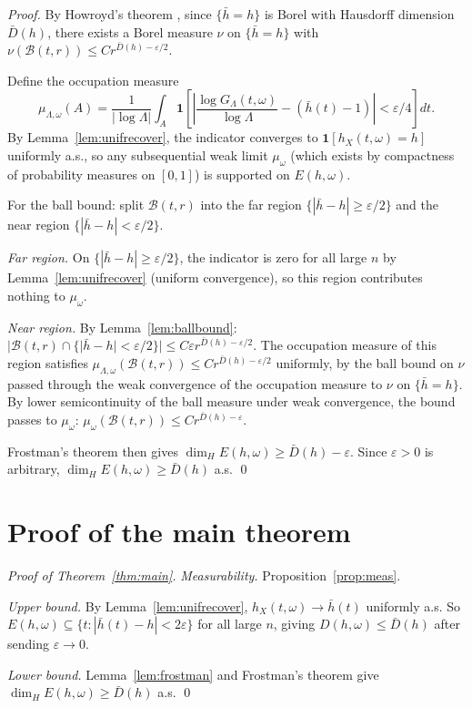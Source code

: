 \documentclass[10pt,a4paper]{amsart}
\newcommand{\GL}{G_\Lambda}
\newcommand{\hb}{\bar{h}}
\begin{document}
\begin{proof}
By Howroyd's theorem \cite{howroyd1995}, since $\{\hb=h\}$ is Borel
with Hausdorff dimension $\bar D(h)$, there exists a Borel measure
$\nu$ on $\{\hb=h\}$ with $\nu(\mathcal{B}(t,r))\le Cr^{\bar D(h)-\varepsilon/2}$.

Define the occupation measure
\[
  \mu_{\Lambda,\omega}(A)
  = \frac{1}{|\log\Lambda|}
  \int_A\mathbf{1}\!\left[\left|\frac{\log\GL(t,\omega)}{\log\Lambda}
    -(\hb(t)-1)\right|<\varepsilon/4\right]dt.
\]
By Lemma~\ref{lem:unifrecover}, the indicator converges to
$\mathbf{1}[h_X(t,\omega)=h]$ uniformly a.s., so any subsequential
weak limit $\mu_\omega$ (which exists by compactness of probability
measures on $[0,1]$) is supported on $E(h,\omega)$.

For the ball bound: split $\mathcal{B}(t,r)$ into the far region
$\{|\hb-h|\ge\varepsilon/2\}$ and the near region
$\{|\hb-h|<\varepsilon/2\}$.

\emph{Far region.} On $\{|\hb-h|\ge\varepsilon/2\}$, the indicator
is zero for all large $n$ by Lemma~\ref{lem:unifrecover} (uniform
convergence), so this region contributes nothing to $\mu_\omega$.

\emph{Near region.} By Lemma~\ref{lem:ballbound}:
$|\mathcal{B}(t,r)\cap\{|\hb-h|<\varepsilon/2\}|\le C\varepsilon r^{\bar D(h)-\varepsilon/2}$.
The occupation measure of this region satisfies
$\mu_{\Lambda,\omega}(\mathcal{B}(t,r))\le Cr^{\bar D(h)-\varepsilon/2}$
uniformly, by the ball bound on $\nu$ passed through the weak
convergence of the occupation measure to $\nu$ on $\{\hb=h\}$.
By lower semicontinuity of the ball measure under weak convergence,
the bound passes to $\mu_\omega$:
$\mu_\omega(\mathcal{B}(t,r))\le Cr^{\bar D(h)-\varepsilon}$.

Frostman's theorem then gives $\dim_H E(h,\omega)\ge\bar D(h)-\varepsilon$.
Since $\varepsilon>0$ is arbitrary, $\dim_H E(h,\omega)\ge\bar D(h)$ a.s. \qed
\end{proof}

\section{Proof of the main theorem}


\begin{proof}[Proof of Theorem~\ref{thm:main}]
\emph{Measurability.} Proposition~\ref{prop:meas}.

\emph{Upper bound.} By Lemma~\ref{lem:unifrecover},
$h_X(t,\omega)\to\hb(t)$ uniformly a.s. So
$E(h,\omega)\subseteq\{t:|\hb(t)-h|<2\varepsilon\}$ for all large
$n$, giving $D(h,\omega)\le\bar D(h)$ after sending $\varepsilon\to0$.

\emph{Lower bound.} Lemma~\ref{lem:frostman} and Frostman's theorem
give $\dim_H E(h,\omega)\ge\bar D(h)$ a.s. \qed
\end{proof}
\end{document}
